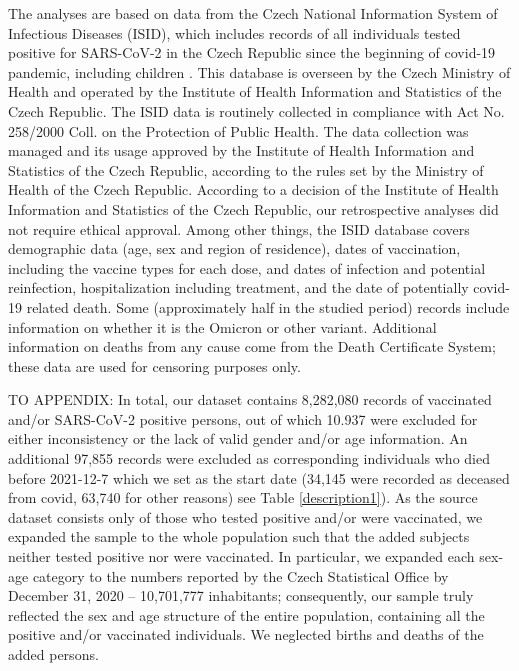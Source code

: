 \documentclass[preprint,12pt,authoryear]{elsarticle}
\begin{document}
The analyses are based on data from the Czech National Information System of Infectious Diseases (ISID), which includes records of all individuals tested positive for SARS-CoV-2 in the Czech Republic since the beginning of covid-19 pandemic, including children \citep{komenda2020}. This database is overseen by the Czech Ministry of Health and operated by the Institute of Health Information and Statistics of the Czech Republic. The ISID data is routinely collected in compliance with  Act No. 258/2000 Coll. on the Protection of Public Health. 
The data collection was managed and its usage approved by the Institute of Health Information and Statistics of the Czech Republic, according to the rules set by the Ministry of Health of the Czech Republic. According to a decision of the Institute of Health Information and Statistics of the Czech Republic, our retrospective analyses did not require ethical approval.
Among other things, the ISID database covers demographic data (age, sex and region of residence), dates of vaccination, including the vaccine types for each dose, and dates of infection and potential reinfection, hospitalization including treatment, and the date of potentially  covid-19 related death. Some (approximately half in the studied period) records include information on whether it is the Omicron or other variant. Additional information on deaths from any cause come from the Death Certificate System; these data are used for censoring purposes only.

{\color{blue} TO APPENDIX: In total, our dataset contains 8,282,080 records of vaccinated and/or SARS-CoV-2 positive persons, out of which 10.937 were excluded for either inconsistency or the lack of valid gender and/or age information. An additional 97,855 records were excluded as corresponding individuals who died before 2021-12-7 which we set as the start date (34,145 were recorded as deceased from covid, 63,740 for other reasons) see Table \ref{description1}). 
As the source dataset consists only of those who  tested positive and/or were vaccinated, we expanded the sample to the whole population such that the added subjects  neither tested positive nor were vaccinated. In particular, we expanded each sex-age category to the numbers reported by the Czech Statistical Office by December 31, 2020 -- 10,701,777 inhabitants; consequently, our sample truly reflected the sex and age structure of the entire population, containing all the positive and/or vaccinated individuals. We neglected births and deaths of the added persons.} 
\end{document}
